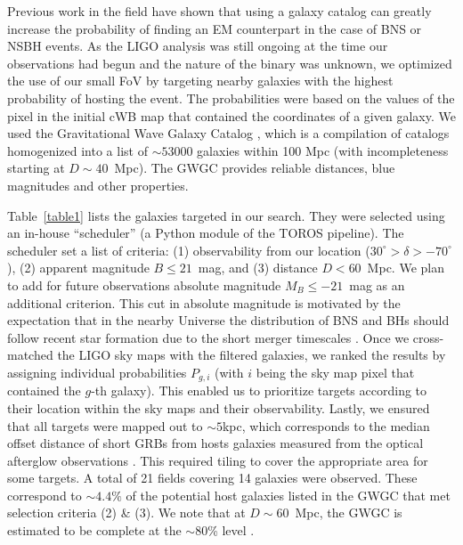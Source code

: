 \documentclass[apjl]{emulateapj}
\begin{document}
Previous work in the field \citep{Nuttall2010,Abadie2012,Hanna2014} have shown that using a galaxy catalog can greatly increase the probability of finding an EM counterpart in the case of BNS or NSBH events. As the LIGO analysis was still ongoing at the time our observations had begun and the nature of the binary was unknown, we optimized the use of our small FoV by targeting nearby galaxies with the highest probability of hosting the event. The probabilities were based on the values of the pixel in the initial cWB map that contained the coordinates of a given galaxy. We used the Gravitational Wave Galaxy Catalog \citep[GWGC;][]{White2011}, which is a compilation of catalogs homogenized into a list of $\sim53000$ galaxies within 100 Mpc (with incompleteness starting at $D\sim40$~Mpc). The GWGC provides reliable distances, blue magnitudes and other properties. 

Table~\ref{table1} lists the galaxies targeted in our search. They were selected using an in-house ``scheduler'' (a Python module of the TOROS pipeline). The scheduler set a list of criteria: (1) observability from our location ($30^\circ > \delta > -70^\circ$), (2) apparent magnitude $B \leq 21$~mag, and (3) distance $D<60$~Mpc.  We plan to add for future observations absolute magnitude $M_B \leq -21$~mag as an additional criterion.  This cut in absolute magnitude is motivated by the expectation that in the nearby Universe the distribution of BNS and BHs should follow recent star formation due to the short merger timescales \citep[see e.g. ][]{Phinney1991,Belczynski2002}. Once we cross-matched the LIGO sky maps with the filtered galaxies, we ranked the results by assigning individual probabilities $P_{g,i}$ (with $i$ being the sky map pixel that contained the $g$-th galaxy). This enabled us to prioritize targets according to their location within the sky maps and their observability. Lastly, we ensured that all targets were mapped out to $\sim5$kpc, which corresponds to the median offset distance of short GRBs from hosts galaxies measured from the optical afterglow observations \citep{Church2011,Fong2013,Berger2014}. This required tiling to cover the appropriate area for some targets. A total of 21 fields covering 14 galaxies were observed. These correspond to $\sim4.4\%$ of the potential host galaxies listed in the GWGC that met selection criteria (2) \& (3). We note that at $D\sim60$~Mpc, the GWGC is estimated to be complete at the $\sim80$\% level \citep{White2011}. 
\end{document}
